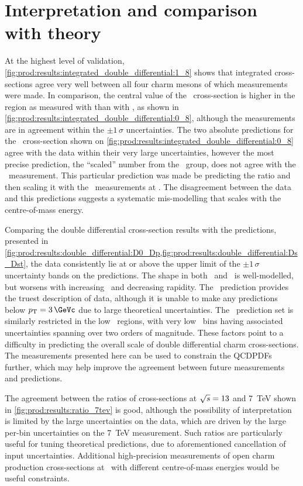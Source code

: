 \section{Interpretation and comparison with theory}
\label{chap:prod:results:discussion}

At the highest level of validation, 
\cref{fig:prod:results:integrated_double_differential:1_8} shows that 
integrated cross-sections agree very well between all four charm mesons of 
which measurements were made.
In comparison, the central value of the \ccbar\ cross-section is higher in the 
 region as measured with \PDzero than with \PDplus, as shown in 
\cref{fig:prod:results:integrated_double_differential:0_8}, although the 
measurements are in agreement within the $\pm1\,\sigma$ uncertainties.
The two absolute predictions for the \ccbar\ cross-section shown on 
\cref{fig:prod:results:integrated_double_differential:0_8} agree with the data 
within their very large uncertainties, however the most precise prediction, the 
``scaled'' number from the \nnpdfl\ group, does not agree with the \lhcb\ 
measurement.
This particular prediction was made be predicting the ratio  
and then scaling it with the \lhcb\ measurements at \sqrtseq{7}.
The disagreement between the data and this predictions suggests a systematic 
mis-modelling that scales with the centre-of-mass energy.

Comparing the double differential cross-section results with the predictions, 
presented in 
\cref{fig:prod:results:double_differential:D0_Dp,fig:prod:results:double_differential:Ds_Dst}, 
the data consistently lie at or above the upper limit of the $\pm1\,\sigma$ 
uncertainty bands on the predictions.
The shape in both \pT\ and \rapidity\ is well-modelled, but worsens with 
increasing \pT\ and decreasing rapidity.
The \gmvfns\ prediction provides the truest description of data, although it is 
unable to make any predictions below $\pT = \SI{3}{\GeVc}$ due to large 
theoretical uncertainties.
The \fonll\ prediction set is similarly restricted in the low \pT\ regions, 
with very low \pT\ bins having associated uncertainties spanning over two 
orders of magnitude.
These factors point to a difficulty in predicting the overall scale of double 
differential charm cross-sections.
The measurements presented here can be used to constrain the \aclp{QCDPDF} 
further, which may help improve the agreement between future measurements and 
predictions.

The agreement between the ratios of cross-sections at $\sqrt{s} = 13$ and 
\SI{7}{\TeV} shown in \cref{fig:prod:results:ratio_7tev} is good, although the 
possibility of interpretation is limited by the large uncertainties on the 
data, which are driven by the large per-bin uncertainties on the \SI{7}{\TeV} 
measurement.
Such ratios are particularly useful for tuning theoretical predictions, due to 
aforementioned cancellation of input uncertainties.
Additional high-precision measurements of open charm production cross-sections 
at \lhcb\ with different centre-of-mass energies would be useful constraints.

